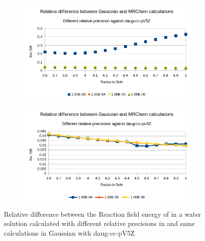 \documentclass[../master_thesis.tex]{subfiles}
\begin{document}
\begin{figure}[h!]
  \centering
  \begin{subfigure}[b]{0.75\linewidth}
    \includegraphics[width=\linewidth]{img/lipprecallreldiff.png}
  \end{subfigure}
  \begin{subfigure}[b]{0.75\linewidth}
    \includegraphics[width=\linewidth]{img/lipprecallreldiffexcl.png}
  \end{subfigure}
  \caption{Relative difference between the Reaction field energy of  in a water solution calculated with different relative precisions in \mrchem  and same calculations in Gaussian with daug-cc-pV5Z}
  \label{fig:lipprecreldefb}
\end{figure}
\end{document}
